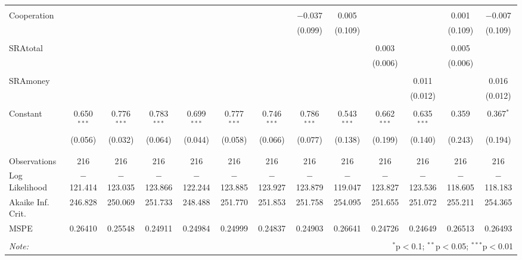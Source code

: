 \begin{table}[H]
\begin{adjustbox}{width=\textwidth}
\begin{tabular}{@{\extracolsep{5pt}}lcccccccccccc}
  & & & & & & & & & & & & \\ 
 Cooperation &  &  &  &  &  &  & $-$0.037 & 0.005 &  &  & 0.001 & $-$0.007 \\ 
  &  &  &  &  &  &  & (0.099) & (0.109) &  &  & (0.109) & (0.109) \\ 
  & & & & & & & & & & & & \\ 
 SRAtotal &  &  &  &  &  &  &  &  & 0.003 &  & 0.005 &  \\ 
  &  &  &  &  &  &  &  &  & (0.006) &  & (0.006) &  \\ 
  & & & & & & & & & & & & \\ 
 SRAmoney &  &  &  &  &  &  &  &  &  & 0.011 &  & 0.016 \\ 
  &  &  &  &  &  &  &  &  &  & (0.012) &  & (0.012) \\ 
  & & & & & & & & & & & & \\ 
 Constant & 0.650$^{***}$ & 0.776$^{***}$ & 0.783$^{***}$ & 0.699$^{***}$ & 0.777$^{***}$ & 0.746$^{***}$ & 0.786$^{***}$ & 0.543$^{***}$ & 0.662$^{***}$ & 0.635$^{***}$ & 0.359 & 0.367$^{*}$ \\ 
  & (0.056) & (0.032) & (0.064) & (0.044) & (0.058) & (0.066) & (0.077) & (0.138) & (0.199) & (0.140) & (0.243) & (0.194) \\ 
  & & & & & & & & & & & & \\ 
\hline \\[-1.8ex] 
Observations & 216 & 216 & 216 & 216 & 216 & 216 & 216 & 216 & 216 & 216 & 216 & 216 \\ 
Log Likelihood & $-$121.414 & $-$123.035 & $-$123.866 & $-$122.244 & $-$123.885 & $-$123.927 & $-$123.879 & $-$119.047 & $-$123.827 & $-$123.536 & $-$118.605 & $-$118.183 \\ 
Akaike Inf. Crit. & 246.828 & 250.069 & 251.733 & 248.488 & 251.770 & 251.853 & 251.758 & 254.095 & 251.655 & 251.072 & 255.211 & 254.365 \\ 
MSPE & 0.26410 & 0.25548 & 0.24911 & 0.24984 & 0.24999 & 0.24837 & 0.24903 & 0.26641 & 0.24726 & 0.24649 & 0.26513 & 0.26493 \\
\hline 
\hline \\[-1.8ex] 
\textit{Note:}  & \multicolumn{12}{r}{$^{*}$p$<$0.1; $^{**}$p$<$0.05; $^{***}$p$<$0.01} \\ 
\end{tabular} 
\end{adjustbox}
\end{table} 

